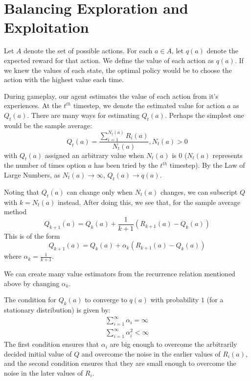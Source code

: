 \documentclass[12pt]{report}
\begin{document}

\section{Balancing Exploration and Exploitation}
Let $A$ denote the set of possible actions. For each $a \in A$, let $q(a)$ denote the expected reward for that action. We define the value of each action as $q(a)$. If we knew the values of each state,
the optimal policy would be to choose the action with the highest value each time.

During gameplay, our agent estimates the value of each action from it's experiences. At the $t^{th}$ timestep, we denote the estimated value for action $a$ as $Q_{t}(a)$.
There are many ways for estimating $Q_{t}(a)$. Perhaps the simplest one would be the sample average:
\begin{equation}
    Q_{t}(a) = \frac{\sum\limits_{i = 1}^{N_{t}(a)}R_{i}(a)}{N_{t}(a)}, N_{t}(a) > 0
\end{equation}
with $Q_{t}(a)$ assigned an arbitrary value when $N_{t}(a)$ is $0$ ($N_{t}(a)$ represents the number of times option $a$ has been tried by the $t^{th}$ timestep). By the Law of Large Numbers, as $N_{t}(a) \rightarrow \infty$, $Q_{t}(a) \rightarrow q(a)$.

Noting that $Q_{t}(a)$ can change only when $N_{t}(a)$ changes, we can subscript $Q$ with $k = N_{t}(a)$ instead. After doing this, we see that, for the sample average method
\begin{equation}
    Q_{k + 1}(a) = Q_{k}(a) + \frac{1}{k + 1}(R_{k + 1}(a) - Q_{k}(a))
\end{equation}
This is of the form
\begin{equation}
    Q_{k + 1}(a) = Q_{k}(a) + \alpha_{k}(R_{k + 1}(a) - Q_{k}(a))
\end{equation}
where $\alpha_{k} = \frac{1}{k + 1}$.

We can create many value estimators from the recurrence relation mentioned above by changing $\alpha_{k}$. 

The condition for $Q_{k}(a)$ to converge to $q(a)$ with probability $1$ (for a stationary distribution) is given by:
\begin{eqnarray}
    \sum\limits_{i = 1}^{\infty} \alpha_{i} = \infty\\
    \sum\limits_{i = 1}^{\infty} \alpha_{i}^{2} < \infty
\end{eqnarray}
The first condition ensures that $\alpha_{i}$ are big enough to overcome the arbitrarily decided initial value of $Q$ and overcome the noise in the earlier values of $R_{i}(a)$, and 
the second condition ensures that they are small enough to overcome the noise in the later values of $R_{i}$.
\end{document}
